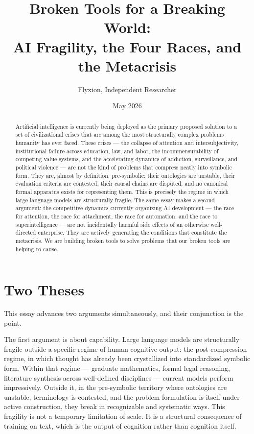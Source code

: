 \documentclass[12pt, a4paper]{article}
\title{\textbf{Broken Tools for a Breaking World:\\
AI Fragility, the Four Races, and the Metacrisis}}
\author{Flyxion, Independent Researcher}
\date{May 2026}
\theoremstyle{remark}
\begin{document}
\maketitle

\begin{abstract}
Artificial intelligence is currently being deployed as the primary proposed solution to a set of civilizational crises that are among the most structurally complex problems humanity has ever faced. These crises --- the collapse of attention and intersubjectivity, institutional failure across education, law, and labor, the incommensurability of competing value systems, and the accelerating dynamics of addiction, surveillance, and political violence --- are not the kind of problems that compress neatly into symbolic form. They are, almost by definition, pre-symbolic: their ontologies are unstable, their evaluation criteria are contested, their causal chains are disputed, and no canonical formal apparatus exists for representing them. This is precisely the regime in which large language models are structurally fragile. The same essay makes a second argument: the competitive dynamics currently organizing AI development --- the race for attention, the race for attachment, the race for automation, and the race to superintelligence --- are not incidentally harmful side effects of an otherwise well-directed enterprise. They are actively generating the conditions that constitute the metacrisis. We are building broken tools to solve problems that our broken tools are helping to cause.
\end{abstract}

\newpage

\section{Two Theses}

This essay advances two arguments simultaneously, and their conjunction is the point.

The first argument is about capability. Large language models are structurally fragile outside a specific regime of human cognitive output: the post-compression regime, in which thought has already been crystallized into standardized symbolic form. Within that regime --- graduate mathematics, formal legal reasoning, literature synthesis across well-defined disciplines --- current models perform impressively. Outside it, in the pre-symbolic territory where ontologies are unstable, terminology is contested, and the problem formulation is itself under active construction, they break in recognizable and systematic ways. This fragility is not a temporary limitation of scale. It is a structural consequence of training on text, which is the output of cognition rather than cognition itself.
\end{document}
